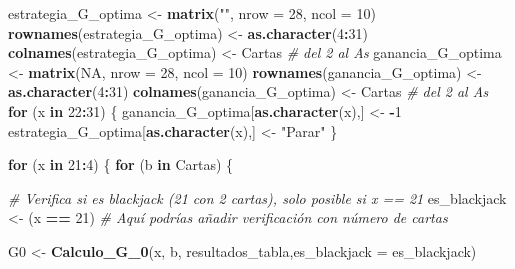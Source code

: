 \documentclass[12pt,a4paper,]{book}
\newenvironment{Shaded}{\begin{snugshade}}{\end{snugshade}}
\newcommand{\AttributeTok}[1]{\textcolor[rgb]{0.13,0.29,0.53}{#1}}
\newcommand{\CommentTok}[1]{\textcolor[rgb]{0.56,0.35,0.01}{\textit{#1}}}
\newcommand{\ConstantTok}[1]{\textcolor[rgb]{0.56,0.35,0.01}{#1}}
\newcommand{\ControlFlowTok}[1]{\textcolor[rgb]{0.13,0.29,0.53}{\textbf{#1}}}
\newcommand{\DecValTok}[1]{\textcolor[rgb]{0.00,0.00,0.81}{#1}}
\newcommand{\FunctionTok}[1]{\textcolor[rgb]{0.13,0.29,0.53}{\textbf{#1}}}
\newcommand{\NormalTok}[1]{#1}
\newcommand{\OtherTok}[1]{\textcolor[rgb]{0.56,0.35,0.01}{#1}}
\newcommand{\SpecialCharTok}[1]{\textcolor[rgb]{0.81,0.36,0.00}{\textbf{#1}}}
\newcommand{\StringTok}[1]{\textcolor[rgb]{0.31,0.60,0.02}{#1}}
\numberwithin{dummy}{section}
\theoremstyle{ocrenumbox}
\theoremstyle{blacknumex}
\theoremstyle{blacknumbox}
\theoremstyle{ocrenum}
\theoremstyle{ocrenum}
\begin{document}
\begin{Shaded}
\begin{Highlighting}[]
\NormalTok{estrategia\_G\_optima }\OtherTok{\textless{}{-}} \FunctionTok{matrix}\NormalTok{(}\StringTok{""}\NormalTok{, }\AttributeTok{nrow =} \DecValTok{28}\NormalTok{, }\AttributeTok{ncol =} \DecValTok{10}\NormalTok{)}
\FunctionTok{rownames}\NormalTok{(estrategia\_G\_optima) }\OtherTok{\textless{}{-}} \FunctionTok{as.character}\NormalTok{(}\DecValTok{4}\SpecialCharTok{:}\DecValTok{31}\NormalTok{)}
\FunctionTok{colnames}\NormalTok{(estrategia\_G\_optima) }\OtherTok{\textless{}{-}}\NormalTok{ Cartas  }\CommentTok{\# del 2 al As}
\NormalTok{ganancia\_G\_optima }\OtherTok{\textless{}{-}} \FunctionTok{matrix}\NormalTok{(}\ConstantTok{NA}\NormalTok{, }\AttributeTok{nrow =} \DecValTok{28}\NormalTok{, }\AttributeTok{ncol =} \DecValTok{10}\NormalTok{)}
\FunctionTok{rownames}\NormalTok{(ganancia\_G\_optima) }\OtherTok{\textless{}{-}} \FunctionTok{as.character}\NormalTok{(}\DecValTok{4}\SpecialCharTok{:}\DecValTok{31}\NormalTok{)}
\FunctionTok{colnames}\NormalTok{(ganancia\_G\_optima) }\OtherTok{\textless{}{-}}\NormalTok{ Cartas  }\CommentTok{\# del 2 al As}
\ControlFlowTok{for}\NormalTok{ (x }\ControlFlowTok{in} \DecValTok{22}\SpecialCharTok{:}\DecValTok{31}\NormalTok{) \{}
\NormalTok{  ganancia\_G\_optima[}\FunctionTok{as.character}\NormalTok{(x),] }\OtherTok{\textless{}{-}} \SpecialCharTok{{-}}\DecValTok{1}
\NormalTok{  estrategia\_G\_optima[}\FunctionTok{as.character}\NormalTok{(x),] }\OtherTok{\textless{}{-}} \StringTok{"Parar"}
\NormalTok{\}}

\ControlFlowTok{for}\NormalTok{ (x }\ControlFlowTok{in} \DecValTok{21}\SpecialCharTok{:}\DecValTok{4}\NormalTok{) \{}
  \ControlFlowTok{for}\NormalTok{ (b }\ControlFlowTok{in}\NormalTok{ Cartas) \{}
    
    \CommentTok{\# Verifica si es blackjack (21 con 2 cartas), solo posible si x == 21}
\NormalTok{    es\_blackjack }\OtherTok{\textless{}{-}}\NormalTok{ (x }\SpecialCharTok{==} \DecValTok{21}\NormalTok{)  }\CommentTok{\# Aquí podrías añadir verificación con número de cartas}
    
\NormalTok{    G0 }\OtherTok{\textless{}{-}} \FunctionTok{Calculo\_G\_0}\NormalTok{(x, b, resultados\_tabla,}\AttributeTok{es\_blackjack =}\NormalTok{ es\_blackjack)}
    

\end{Highlighting}
\end{Shaded}
\end{document}
